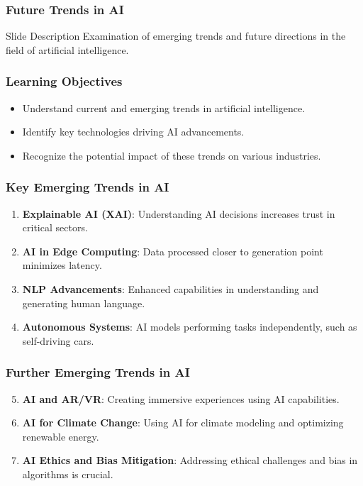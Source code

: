 \documentclass[aspectratio=169]{beamer}
\begin{document}
\begin{frame}[fragile]
    \frametitle{Future Trends in AI}
    \begin{block}{Slide Description}
        Examination of emerging trends and future directions in the field of artificial intelligence.
    \end{block}
\end{frame}

\begin{frame}[fragile]
    \frametitle{Learning Objectives}
    \begin{itemize}
        \item Understand current and emerging trends in artificial intelligence.
        \item Identify key technologies driving AI advancements.
        \item Recognize the potential impact of these trends on various industries.
    \end{itemize}
\end{frame}

\begin{frame}[fragile]
    \frametitle{Key Emerging Trends in AI}
    \begin{enumerate}
        \item \textbf{Explainable AI (XAI)}: Understanding AI decisions increases trust in critical sectors.
        \item \textbf{AI in Edge Computing}: Data processed closer to generation point minimizes latency.
        \item \textbf{NLP Advancements}: Enhanced capabilities in understanding and generating human language.
        \item \textbf{Autonomous Systems}: AI models performing tasks independently, such as self-driving cars.
    \end{enumerate}
\end{frame}

\begin{frame}[fragile]
    \frametitle{Further Emerging Trends in AI}
    \begin{enumerate}
        \setcounter{enumi}{4}  %
        \item \textbf{AI and AR/VR}: Creating immersive experiences using AI capabilities.
        \item \textbf{AI for Climate Change}: Using AI for climate modeling and optimizing renewable energy.
        \item \textbf{AI Ethics and Bias Mitigation}: Addressing ethical challenges and bias in algorithms is crucial.
    \end{enumerate}
\end{frame}
\end{document}
